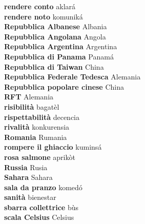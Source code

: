 \textbf{ rendere conto  } aklará \\
\textbf{ rendere noto  } komuniká \\
\textbf{ Repubblica Albanese  } Albania \\
\textbf{ Repubblica Angolana  } Angola \\
\textbf{ Repubblica Argentina  } Argentina \\
\textbf{ Repubblica di Panama  } Panamá \\
\textbf{ Repubblica di Taiwan  } China \\
\textbf{ Repubblica Federale Tedesca  } Alemania \\
\textbf{ Repubblica popolare cinese  } China \\
\textbf{ RFT  } Alemania \\
\textbf{ risibilità  } bagatèl \\
\textbf{ rispettabilità  } decencia \\
\textbf{ rivalità  } konkurensia \\
\textbf{ Romania  } Rumania \\
\textbf{ rompere il ghiaccio  } kuminsá \\
\textbf{ rosa salmone  } aprikòt \\
\textbf{ Russia  } Rusia \\
\textbf{ Sahara  } Sahara \\
\textbf{ sala da pranzo  } komedó \\
\textbf{ sanità  } bienestar \\
\textbf{ sbarra collettrice  } bùs \\
\textbf{ scala Celsius  } Celsius \\
